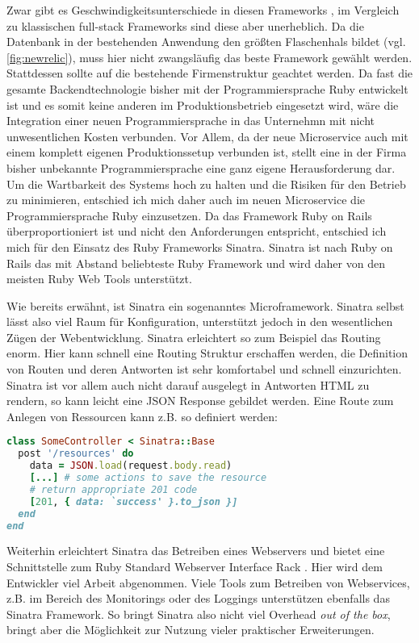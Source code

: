 Zwar gibt es Geschwindigkeitsunterschiede in diesen Frameworks \cite[vgl.][]{frameworks}, im Vergleich zu klassischen full-stack Frameworks sind diese aber unerheblich. Da die Datenbank in der bestehenden Anwendung den größten Flaschenhals bildet (vgl. \autoref{fig:newrelic}), muss hier nicht zwangsläufig das beste Framework gewählt werden. Stattdessen sollte auf die bestehende Firmenstruktur geachtet werden. Da fast die gesamte Backendtechnologie bisher mit der Programmiersprache Ruby entwickelt ist und es somit keine anderen im Produktionsbetrieb eingesetzt wird, wäre die Integration einer neuen Programmiersprache in das Unternehmn mit nicht unwesentlichen Kosten verbunden. Vor Allem, da der neue Microservice auch mit einem komplett eigenen Produktionssetup verbunden ist, stellt eine in der Firma bisher unbekannte Programmiersprache eine ganz eigene Herausforderung dar. Um die Wartbarkeit des Systems hoch zu halten und die Risiken für den Betrieb zu minimieren, entschied ich mich daher auch im neuen Microservice die Programmiersprache Ruby einzusetzen. Da das Framework Ruby on Rails überproportioniert ist und nicht den Anforderungen entspricht, entschied ich mich für den Einsatz des Ruby Frameworks Sinatra.
Sinatra ist nach Ruby on Rails das mit Abstand beliebteste Ruby Framework\cite[vgl.][]{ruby2015} und wird daher von den meisten Ruby Web Tools unterstützt.

Wie bereits erwähnt, ist Sinatra ein sogenanntes Microframework. Sinatra selbst lässt also viel Raum für Konfiguration, unterstützt jedoch in den wesentlichen Zügen der Webentwicklung. Sinatra erleichtert so zum Beispiel das Routing enorm. Hier kann schnell eine Routing Struktur erschaffen werden, die Definition von Routen und deren Antworten ist sehr komfortabel und schnell einzurichten. Sinatra ist vor allem auch nicht darauf ausgelegt in Antworten HTML zu rendern, so kann leicht eine JSON Response gebildet werden.
Eine Route zum Anlegen von Ressourcen kann z.B. so definiert werden:
\begin{lstlisting}[showstringspaces=false,language=Ruby]
class SomeController < Sinatra::Base
  post '/resources' do
    data = JSON.load(request.body.read)
    [...] # some actions to save the resource
    # return appropriate 201 code
    [201, { data: `success' }.to_json }]
  end
end
\end{lstlisting}

Weiterhin erleichtert Sinatra das Betreiben eines Webservers und bietet eine Schnittstelle zum Ruby Standard Webserver Interface Rack \cite{rack}. Hier wird dem Entwickler viel Arbeit abgenommen. Viele Tools zum Betreiben von Webservices, z.B. im Bereich des Monitorings oder des Loggings unterstützen ebenfalls das Sinatra Framework. So bringt Sinatra also nicht viel Overhead \textit{out of the box}, bringt aber die Möglichkeit zur Nutzung vieler praktischer Erweiterungen.

